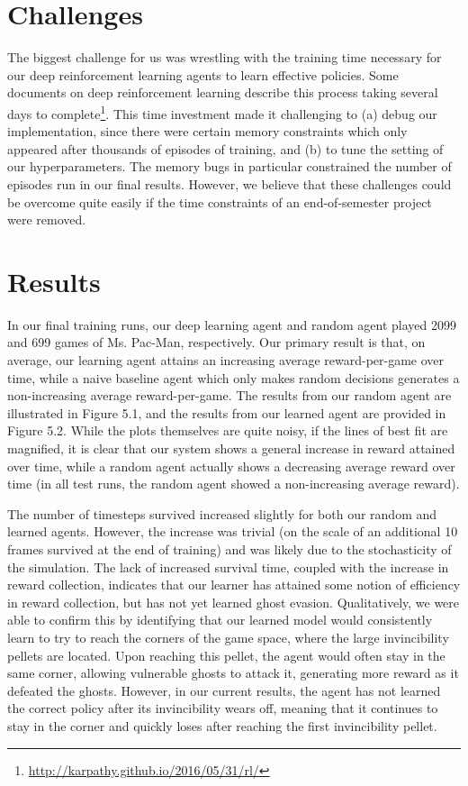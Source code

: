 \documentclass[paper=a4, fontsize=11pt]{scrartcl} %
\numberwithin{equation}{section} %
\numberwithin{figure}{section} %
\numberwithin{table}{section} %
\begin{document}
\section{Challenges}

The biggest challenge for us was wrestling with the training time necessary for our deep reinforcement learning agents to learn effective policies. Some documents on deep reinforcement learning describe this process taking several days to complete\footnote{\url{http://karpathy.github.io/2016/05/31/rl/}}. This time investment made it challenging to (a) debug our implementation, since there were certain memory constraints which only appeared after thousands of episodes of training, and (b) to tune the setting of our hyperparameters. The memory bugs in particular constrained the number of episodes run in our final results. However, we believe that these challenges could be overcome quite easily if the time constraints of an end-of-semester project were removed.

\section{Results}

In our final training runs, our deep learning agent and random agent played 2099 and 699 games of Ms. Pac-Man, respectively. Our primary result is that, on average, our learning agent attains an increasing average reward-per-game over time, while a naive baseline agent which only makes random decisions generates a non-increasing average reward-per-game. The results from our random agent are illustrated in Figure 5.1, and the results from our learned agent are provided in Figure 5.2. While the plots themselves are quite noisy, if the lines of best fit are magnified, it is clear that our system shows a general increase in reward attained over time, while a random agent actually shows a decreasing average reward over time (in all test runs, the random agent showed a non-increasing average reward). 

The number of timesteps survived increased slightly for both our random and learned agents. However, the increase was trivial (on the scale of an additional 10 frames survived at the end of training) and was likely due to the stochasticity of the simulation. The lack of increased survival time, coupled with the increase in reward collection, indicates that our learner has attained some notion of efficiency in reward collection, but has not yet learned ghost evasion. Qualitatively, we were able to confirm this by identifying that our learned model would consistently learn to try to reach the corners of the game space, where the large invincibility pellets are located. Upon reaching this pellet, the agent would often stay in the same corner, allowing vulnerable ghosts to attack it, generating more reward as it defeated the ghosts. However, in our current results, the agent has not learned the correct policy after its invincibility wears off, meaning that it continues to stay in the corner and quickly loses after reaching the first invincibility pellet.
\end{document}
